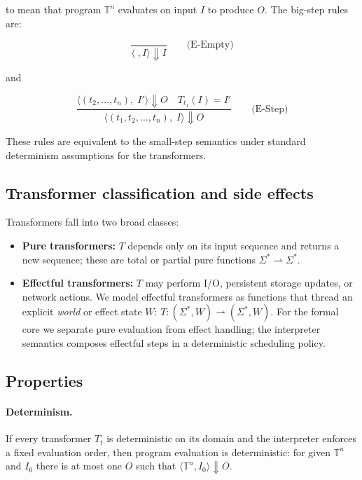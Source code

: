 \documentclass[acmtoplas]{acmart}
\begin{document}
to mean that program \(\mathbb{T}^n\) evaluates on input \(I\) to produce \(O\).  The big-step rules are:


\vspace{1em}
\[
\frac{}{\langle \; , I \rangle \Downarrow I} \qquad\text{(E-Empty)}
\]
\vspace{1em}

and

\vspace{1em}
\[
\frac{\langle (t_2,\dots,t_n),\; I' \rangle \Downarrow O \quad T_{t_1}(I)=I'}{\langle (t_1,t_2,\dots,t_n),\; I \rangle \Downarrow O} \qquad\text{(E-Step)}
\]
\vspace{1em}


These rules are equivalent to the small-step semantics under standard determinism assumptions for the transformers.

\subsection{Transformer classification and side effects}
Transformers fall into two broad classes:

\begin{itemize}
  \item \textbf{Pure transformers:} \(T\) depends only on its input sequence and returns a new sequence; these are total or partial pure functions \( \Sigma^* \rightharpoonup \Sigma^* \).
  \item \textbf{Effectful transformers:} \(T\) may perform I/O, persistent storage updates, or network actions.  We model effectful transformers as functions that thread an explicit \emph{world} or effect state \(W\): \(T : (\Sigma^*, W) \rightharpoonup (\Sigma^*, W)\).  For the formal core we separate pure evaluation from effect handling; the interpreter semantics composes effectful steps in a deterministic scheduling policy.
\end{itemize}

\subsection{Properties}
\paragraph{Determinism.} If every transformer \(T_{t}\) is deterministic on its domain and the interpreter enforces a fixed evaluation order, then program evaluation is deterministic: for given \(\mathbb{T}^n\) and \(I_0\) there is at most one \(O\) such that \(\langle \mathbb{T}^n, I_0\rangle \Downarrow O\).
\end{document}

